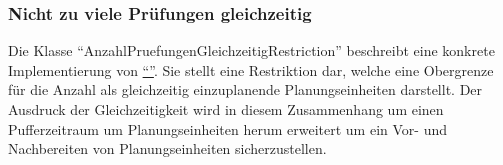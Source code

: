 \subsubsection{Nicht zu viele Prüfungen gleichzeitig}\label{subsubsec:nicht-zu-viele-pruefungen-gleichzeitig}
Die Klasse \enquote{AnzahlPruefungenGleichzeitigRestriction} beschreibt eine konkrete Implementierung von
\hyperref[subsubsec:anzahl-gleichzeitig-zu-hoch]{\enquote{}}.
Sie stellt eine Restriktion dar, welche eine Obergrenze für die Anzahl als gleichzeitig einzuplanende
Planungseinheiten darstellt.
Der Ausdruck der Gleichzeitigkeit wird in diesem Zusammenhang um einen Pufferzeitraum
um Planungseinheiten herum erweitert um ein Vor- und Nachbereiten von Planungseinheiten sicherzustellen.
